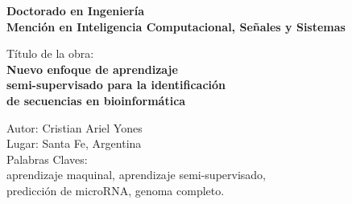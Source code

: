 \newpage
\thispagestyle{empty}

\noindent \textbf{\Large Doctorado en Ingeniería}\\
\noindent\textbf{\large Mención en Inteligencia Computacional, Señales y Sistemas}\\

\vspace{1cm}

\noindent\textrm{\large Título de la obra:}\\[0.2 cm]
\noindent\textbf{\Large
Nuevo enfoque de aprendizaje\\[0.1 cm]
semi-supervisado para la identificación\\[0.1 cm]
de secuencias en bioinformática}\\

\vspace{1cm}

\noindent\textrm{\large Autor: Cristian Ariel Yones}\\[0.6 cm]
\noindent\textrm{\large Lugar: Santa Fe, Argentina}\\[0.6 cm]
\noindent\textrm{\large Palabras Claves: }\\[0.6 cm]
\noindent\textrm{\large
aprendizaje maquinal, aprendizaje semi-supervisado, \\ predicción de microRNA, genoma completo.}

